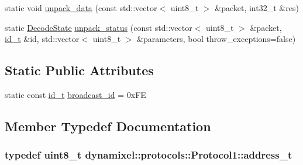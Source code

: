 \begin{DoxyCompactItemize}
\item 
static void \hyperlink{classdynamixel_1_1protocols_1_1_protocol1_ac5c7564982fadaeb0ff1e1d2163e4cea}{unpack\+\_\+data} (const std\+::vector$<$ uint8\+\_\+t $>$ \&packet, int32\+\_\+t \&res)
\item 
static \hyperlink{classdynamixel_1_1protocols_1_1_protocol1_a84867f282d00506d43ebca811925fbcc}{Decode\+State} \hyperlink{classdynamixel_1_1protocols_1_1_protocol1_a4f79051bd5a2d77fd30eadaa16740b77}{unpack\+\_\+status} (const std\+::vector$<$ uint8\+\_\+t $>$ \&packet, \hyperlink{classdynamixel_1_1protocols_1_1_protocol1_a1d4dfa22b01f80b1876d14f539d52b5c}{id\+\_\+t} \&id, std\+::vector$<$ uint8\+\_\+t $>$ \&parameters, bool throw\+\_\+exceptions=false)
\end{DoxyCompactItemize}
\subsection*{Static Public Attributes}
\begin{DoxyCompactItemize}
\item 
static const \hyperlink{classdynamixel_1_1protocols_1_1_protocol1_a1d4dfa22b01f80b1876d14f539d52b5c}{id\+\_\+t} \hyperlink{classdynamixel_1_1protocols_1_1_protocol1_ac14fd1ffbfadfccf29a923149f416de2}{broadcast\+\_\+id} = 0x\+F\+E
\end{DoxyCompactItemize}


\subsection{Member Typedef Documentation}
\hypertarget{classdynamixel_1_1protocols_1_1_protocol1_a4383ba392b57ea00dd0273c6da5e8a65}{}
\subsubsection[{address\+\_\+t}]{\setlength{\rightskip}{0pt plus 5cm}typedef uint8\+\_\+t {\bf dynamixel\+::protocols\+::\+Protocol1\+::address\+\_\+t}}\label{classdynamixel_1_1protocols_1_1_protocol1_a4383ba392b57ea00dd0273c6da5e8a65}
\hypertarget{classdynamixel_1_1protocols_1_1_protocol1_a1d4dfa22b01f80b1876d14f539d52b5c}{}
